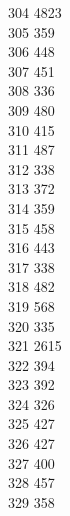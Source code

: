 { 304	4823 \\
 305	359 \\
 306	448 \\
 307	451 \\
 308	336 \\
 309	480 \\
 310	415 \\
 311	487 \\
 312	338 \\
 313	372 \\
 314	359 \\
 315	458 \\
 316	443 \\
 317	338 \\
 318	482 \\
 319	568 \\
 320	335 \\
 321	2615 \\
 322	394 \\
 323	392 \\
 324	326 \\
 325	427 \\
 326	427 \\
 327	400 \\
 328	457 \\
 329	358 \\
}
